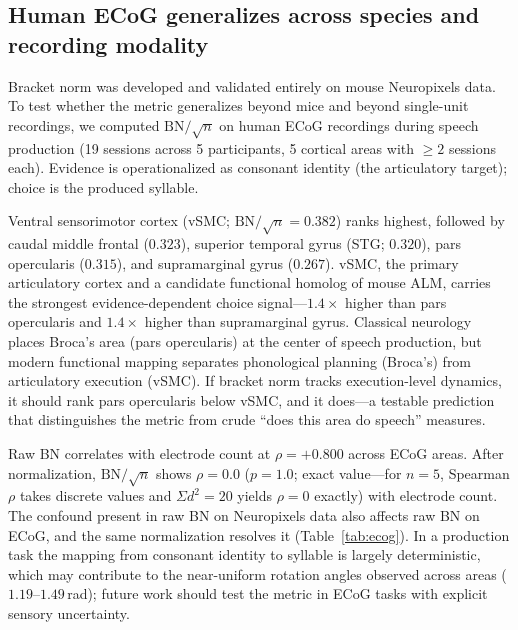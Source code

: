 \documentclass[9pt,lineno]{elife}
\begin{document}
\subsection{Human ECoG generalizes across species and recording modality}
\label{sec:ecog}

Bracket norm was developed and validated entirely on mouse Neuropixels data. To test whether the metric generalizes beyond mice and beyond single-unit recordings, we computed $\text{BN}/\!\sqrt{n}$ on human ECoG recordings during speech production \citep{dandi000019} (19 sessions across 5 participants, 5 cortical areas with $\geq 2$ sessions each). Evidence is operationalized as consonant identity (the articulatory target); choice is the produced syllable.

Ventral sensorimotor cortex (vSMC; $\text{BN}/\!\sqrt{n} = 0.382$) ranks highest, followed by caudal middle frontal ($0.323$), superior temporal gyrus (STG; $0.320$), pars opercularis ($0.315$), and supramarginal gyrus ($0.267$). vSMC, the primary articulatory cortex and a candidate functional homolog of mouse ALM, carries the strongest evidence-dependent choice signal---$1.4\times$ higher than pars opercularis and $1.4\times$ higher than supramarginal gyrus. Classical neurology places Broca's area (pars opercularis) at the center of speech production, but modern functional mapping separates phonological planning (Broca's) from articulatory execution (vSMC). If bracket norm tracks execution-level dynamics, it should rank pars opercularis below vSMC, and it does---a testable prediction that distinguishes the metric from crude ``does this area do speech'' measures.

Raw BN correlates with electrode count at $\rho = +0.800$ across ECoG areas. After normalization, $\text{BN}/\!\sqrt{n}$ shows $\rho = 0.0$ ($p = 1.0$; exact value---for $n = 5$, Spearman $\rho$ takes discrete values and $\Sigma d^2 = 20$ yields $\rho = 0$ exactly) with electrode count. The confound present in raw BN on Neuropixels data also affects raw BN on ECoG, and the same normalization resolves it (Table~\ref{tab:ecog}). In a production task the mapping from consonant identity to syllable is largely deterministic, which may contribute to the near-uniform rotation angles observed across areas ($1.19$--$1.49$\,rad); future work should test the metric in ECoG tasks with explicit sensory uncertainty.
\end{document}
